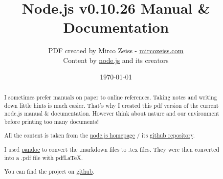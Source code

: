 \documentclass[10pt, a4paper, titlepage, oneside, plain]{article}
\begin{document}
	\title{Node.js v0.10.26 Manual \& Documentation}
	\author{PDF created by Mirco Zeiss - \href{http://mircozeiss.com}{mircozeiss.com}\\Content by \href{http://www.nodejs.org}{node.js} and its creators}
	\date{\today}

	\maketitle

	\begin{abstract}
	I sometimes prefer manuals on paper to online references. Taking notes and writing down little hints is much easier. That's why I created this pdf version of the current node.js manual \& documentation. However think about nature and our environment before printing too many documents!

	All the content is taken from the \href{http://www.nodejs.org}{node.js homepage} / its \href{https://github.com/joyent/node}{github repository}.

	I used \href{http://johnmacfarlane.net/pandoc/}{pandoc} to convert the .markdown files to .tex files. They were then converted into a .pdf file with pdfLaTeX.

	You can find the project on \href{https://github.com/zeMirco/nodejs-pdf-docs}{github}.
	\end{abstract}

	\tableofcontents

	
	
	
	
	
	
	
					
	
	
	
	
	
				
	
	
	
	
	
	
	
	
	
	
	
	
\end{document}

